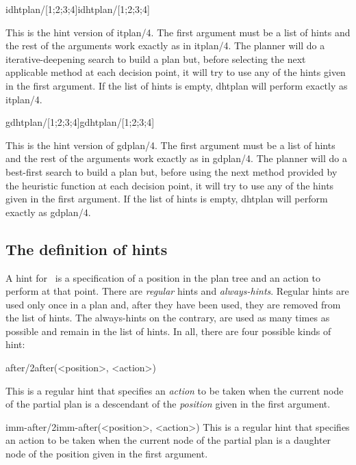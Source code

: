 \begin{predicate}{idhtplan/[1;2;3;4]}{idhtplan/[1;2;3;4]}%

        This is the hint version of itplan/4. The first argument must be
a list of hints and the rest of the arguments work exactly as in
itplan/4.  The planner will do a iterative-deepening search to build a
plan but, before selecting the next applicable method at each decision
point, it will try to use any of the hints given in the first argument.
If the list of hints is empty, dhtplan will perform exactly as itplan/4.
\end{predicate}

\begin{predicate}{gdhtplan/[1;2;3;4]}{gdhtplan/[1;2;3;4]}%

        This is the hint version of gdplan/4. The first argument must be
a list of hints and the rest of the arguments work exactly as in
gdplan/4.  The planner will do a best-first search to build a plan but,
before using the next method provided by the heuristic function at each
decision point, it will try to use any of the hints given in the first
argument. If the list of hints is empty, dhtplan will perform exactly as
gdplan/4.
\end{predicate}

\subsection {The definition of hints}

        A hint for \clam\ is a specification of a position in the plan
tree and an action to perform at that point. There are {\em regular\/}
hints and {\em always-hints}. Regular hints are used only once in a plan
and, after they have been used, they are removed from the list of hints.
The always-hints on the contrary, are used as many times as possible and
remain in the list of hints. In all, there are four possible kinds of
hint:
\begin{predicate}{after/2}{after(<position>, <action>)}%

This is a regular hint that specifies an {\em action\/} to be
taken when the current node of the partial plan is a descendant of the
{\em position\/} given in the first argument.
\end{predicate}

\begin{predicate}{imm-after/2}{imm-after(<position>, <action>)}%
        This is a regular hint that specifies an action to be taken when the
current node of the partial plan is a daughter node of the position
given in the first argument.
\end{predicate}

